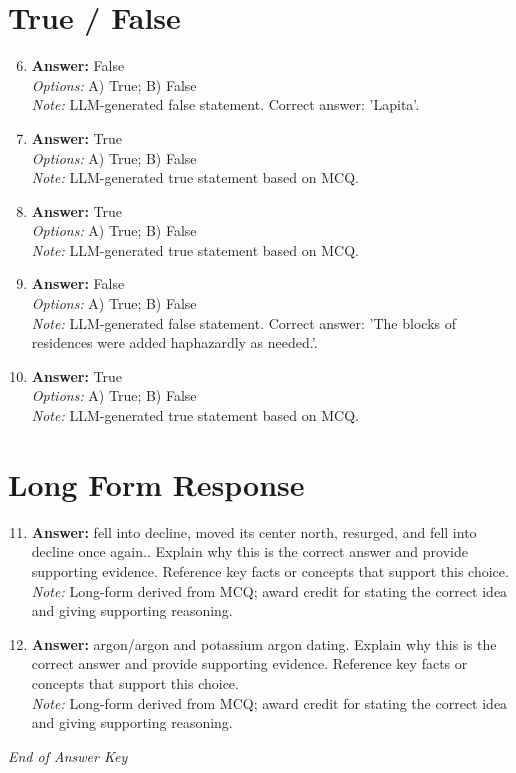 \documentclass[12pt]{article}
\begin{document}
\section*{True / False}
\begin{enumerate}[label=\arabic*.]
\setcounter{enumi}{5}
\item \textbf{Answer:} False
\\ \textit{Options:} A) True; B) False
\\ \textit{Note:} LLM-generated false statement. Correct answer: 'Lapita'.
\item \textbf{Answer:} True
\\ \textit{Options:} A) True; B) False
\\ \textit{Note:} LLM-generated true statement based on MCQ.
\item \textbf{Answer:} True
\\ \textit{Options:} A) True; B) False
\\ \textit{Note:} LLM-generated true statement based on MCQ.
\item \textbf{Answer:} False
\\ \textit{Options:} A) True; B) False
\\ \textit{Note:} LLM-generated false statement. Correct answer: 'The blocks of residences were added haphazardly as needed.'.
\item \textbf{Answer:} True
\\ \textit{Options:} A) True; B) False
\\ \textit{Note:} LLM-generated true statement based on MCQ.
\end{enumerate}

\section*{Long Form Response}
\begin{enumerate}[label=\arabic*.]
\setcounter{enumi}{10}
\item \textbf{Answer:} fell into decline, moved its center north, resurged, and fell into decline once again.. Explain why this is the correct answer and provide supporting evidence. Reference key facts or concepts that support this choice.
\\ \textit{Note:} Long-form derived from MCQ; award credit for stating the correct idea and giving supporting reasoning.
\item \textbf{Answer:} argon/argon and potassium argon dating. Explain why this is the correct answer and provide supporting evidence. Reference key facts or concepts that support this choice.
\\ \textit{Note:} Long-form derived from MCQ; award credit for stating the correct idea and giving supporting reasoning.
\end{enumerate}

\vfill
\noindent\textit{End of Answer Key}
\end{document}
